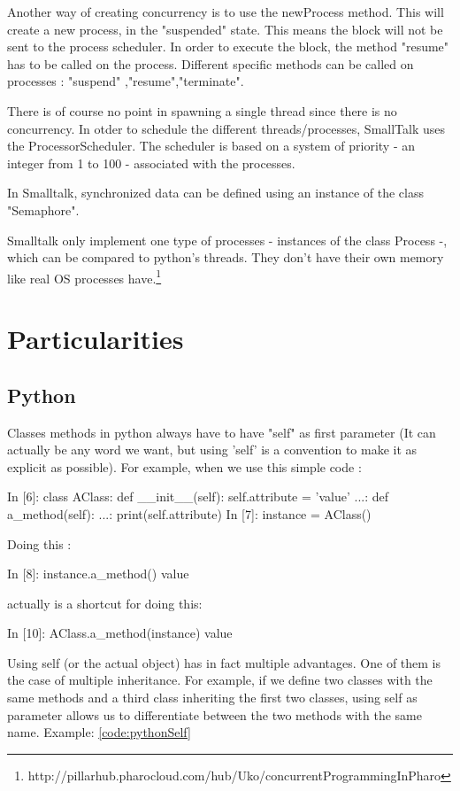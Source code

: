 \documentclass[12pt,a4paper]{scrartcl}
\begin{document}
\begin{multicols}{2}
Another way of creating concurrency is to use the newProcess method. This will create a new process, in the "suspended" state. This means the block will not be sent to the process scheduler. In order to execute the block, the method "resume" has to be called on the process. Different specific methods can be called on processes : "suspend" ,"resume","terminate". 

There is of course no point in spawning a single thread since there is no concurrency. In otder to schedule the different threads/processes, SmallTalk uses the ProcessorScheduler. The scheduler is based on a system of priority - an integer from 1 to 100 - associated with the processes. 

In Smalltalk, synchronized data can be defined using an instance of the class "Semaphore".

Smalltalk only implement one type of processes - instances of the class Process -, which can be compared to python's threads. They don't have their own memory like real OS processes have.\footnote{http://pillarhub.pharocloud.com/hub/Uko/concurrentProgrammingInPharo}

\section{Particularities}
\subsection{Python}
Classes methods in python always have to have "self" as first parameter (It can actually be any word we want, but using 'self' is a convention to make it as explicit as possible). For example, when we use this simple code : 
\begin{python}
In [6]: class AClass:
    def __init__(self):
        self.attribute = 'value'
   ...:     def a_method(self):
   ...:         print(self.attribute)
In [7]: instance = AClass()
\end{python}
Doing this :
\begin{python}
In [8]: instance.a_method()
value
\end{python}
actually is a shortcut for doing this:
\begin{python}
In [10]: AClass.a_method(instance)
value
\end{python}

Using self (or the actual object) has in fact multiple advantages. One of them is the case of multiple inheritance. For example, if we define two classes with the same methods and a third class inheriting the first two classes, using self as parameter allows us to differentiate between the two methods with the same name.
Example: \ref{code:pythonSelf}


\end{multicols}
\end{document}
